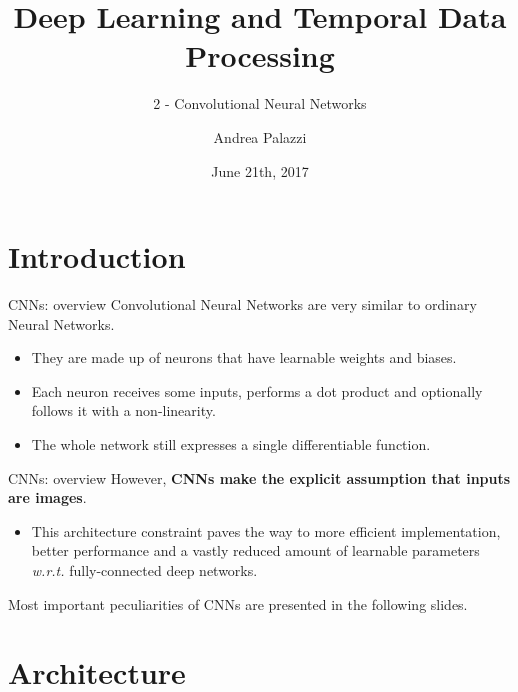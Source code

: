 \documentclass[aspectratio=169]{beamer}
\title[Deep Learning and Temporal Data Processing]{Deep Learning and Temporal Data Processing}
\subtitle{2 - Convolutional Neural Networks}
\institute{University of Modena and Reggio Emilia}
\author{Andrea Palazzi}
\date{June 21th, 2017}
\def\thisframelogos{}
\newcommand{\framelogo}[1]{\def\thisframelogos{#1}}
\begin{document}
\framelogo{logo_unimore_white.png}







\section{Introduction}


\begin{frame}{CNNs: overview}
Convolutional Neural Networks are very similar to ordinary Neural Networks.\\
\begin{itemize}
\item They are made up of neurons that have learnable weights and biases.
\item Each neuron receives some inputs, performs a dot product and optionally follows it with a non-linearity.
\item The whole network still expresses a single differentiable function.
\end{itemize}
\end{frame}


\begin{frame}{CNNs: overview}
However, \textbf{CNNs make the explicit assumption that inputs are images}.
\begin{itemize}
\item \large{This architecture constraint paves the way to more efficient implementation, better performance and a vastly reduced amount of learnable parameters \emph{w.r.t.} fully-connected deep networks.}
\end{itemize}
Most important peculiarities of CNNs are presented in the following slides.
\end{frame}




\section{Architecture}
\end{document}
